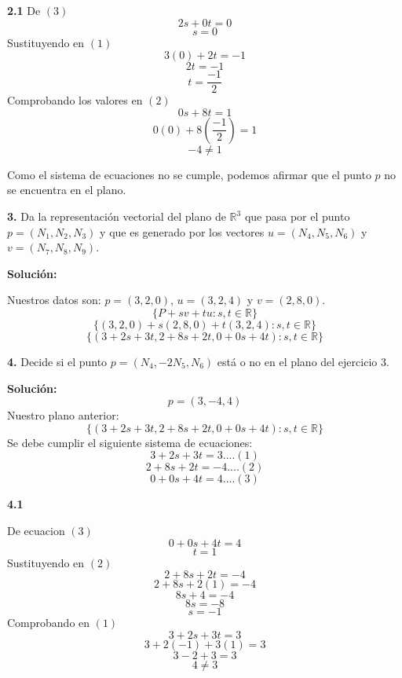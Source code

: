 \documentclass{article}
\begin{document}
\begin{center}\begin{minipage}[c]{5cm}
    \textbf{2.1}
    \vspace{10pt}
    De $(3)$
    $$2s +0t = 0$$
    $$s = 0$$
    Sustituyendo en $(1)$
    $$3(0)+2t = -1$$
    $$2t = -1$$
    $$t = \frac{-1}{2}$$
    Comprobando los valores en $(2)$
    $$0s+8t = 1$$
    $$0(0)+ 8(\frac{-1}{2}) = 1$$
    $$-4 \neq 1$$
\end{minipage}
\end{center}

Como el sistema de ecuaciones no se cumple, podemos afirmar que el punto $p$ no se encuentra en el plano.
\vspace{10pt}

\textbf{3.} Da la representación vectorial del plano de $\mathbb{R}^3$ que pasa por el punto $p = (N_1,N_2,N_3)$ y
que es generado por los vectores $u = (N_4, N_5, N_6)$ y $v = (N_7, N_8, N_9)$.
\vspace{10pt}

\textbf{Solución:}
\vspace*{10pt}

Nuestros datos son: $p = (3,2,0)$, $u = (3, 2, 4)$ y $v = (2, 8, 0)$.
$$\{P + sv + tu : s,t \in \mathbb{R}\}$$
$$\{(3,2,0) + s(2, 8, 0) + t(3, 2, 4) : s,t \in \mathbb{R}\}$$
$$\{(3+2s+3t, 2+8s+2t,0+0s+4t): s,t \in \mathbb{R}\}$$
\vspace{10pt}

\textbf{4.} Decide si el punto $p= (N_4, -2N_5, N_6)$ está o no en el plano del ejercicio 3.
\vspace*{10pt}

\textbf{Solución:}
\vspace{10pt}
$$p =(3, -4, 4)$$
Nuestro plano anterior:
$$\{(3+2s+3t, 2+8s+2t,0+0s+4t): s,t \in \mathbb{R}\}$$
Se debe cumplir el siguiente sistema de ecuaciones:
$$3+2s+3t = 3....(1)$$
$$2+8s+2t = -4....(2)$$
$$0+0s+4t=4....(3)$$

\center\begin{minipage}[c]{5cm}
    \textbf{4.1}
    \vspace{10pt}
    
    De ecuacion $(3)$
    $$0+0s+4t=4$$
    $$t = 1$$
    Sustituyendo en $(2)$
    $$2+8s+2t = -4$$
    $$2+ 8s + 2(1) = -4$$
    $$ 8s +4 = -4$$
    $$8s = -8$$
    $$s = -1$$
    Comprobando en $(1)$
    $$3+2s+3t = 3$$
    $$3+2(-1)+3(1) = 3$$
    $$3 -2 +3 = 3$$
    $$4 \neq 3$$
\end{minipage}
\end{document}
